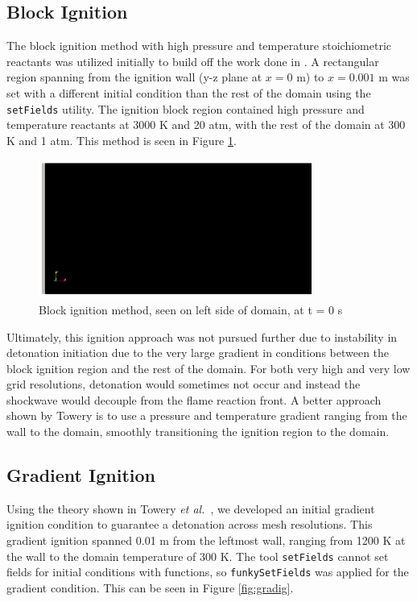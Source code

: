 \subsection{Block Ignition}

The block ignition method with high pressure and temperature stoichiometric reactants was utilized initially to build off the work done in \cite{towery1}. A rectangular region spanning from the ignition wall (y-z plane at \(x = 0\) m) to \(x = 0.001\) m was set with a different initial condition than the rest of the domain using the \verb|setFields| utility. The ignition block region contained high pressure and temperature reactants at 3000 K and 20 atm, with the rest of the domain at 300 K and 1 atm. This method is seen in Figure \ref{fig:blockig}.

\begin{figure}[t!]
\centering
\includegraphics[width=0.8\textwidth]{figs/ignition/block.png}
\caption{Block ignition method, seen on left side of domain, at t = 0 s}
\label{fig:blockig}
\end{figure}%

Ultimately, this ignition approach was not pursued further due to instability in detonation initiation due to the very large gradient in conditions between the block ignition region and the rest of the domain. For both very high and very low grid resolutions, detonation would sometimes not occur and instead the shockwave would decouple from the flame reaction front. A better approach shown by Towery\cite{towery2} is to use a pressure and temperature gradient ranging from the wall to the domain, smoothly transitioning the ignition region to the domain. 

\subsection{Gradient Ignition}
Using the theory shown in Towery \textit{et al.}~\cite{towery2}, we developed an initial gradient ignition condition to guarantee a detonation across mesh resolutions. This gradient ignition spanned 0.01 m from the leftmost wall, ranging from 1200 K at the wall to the domain temperature of 300 K. The tool \verb|setFields| cannot set fields for initial conditions with functions, so \verb|funkySetFields| was applied for the gradient condition. This can be seen in Figure \ref{fig:gradig}. 

